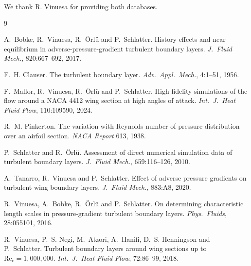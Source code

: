 \documentclass[11pt,a4paper]{article}
\begin{document}
We thank R. Vinuesa for providing both databases.

\begin{thebibliography}{9}
\small

A.~Bobke, R.~Vinuesa, R.~Örlü and P.~Schlatter.
History effects and near equilibrium in adverse-pressure-gradient turbulent
boundary layers.
\emph{J.\ Fluid Mech.}, 820:667--692, 2017.

F.~H. Clauser.
The turbulent boundary layer.
\emph{Adv.\ Appl.\ Mech.}, 4:1--51, 1956.

F.~Mallor, R.~Vinuesa, R.~Örlü and P.~Schlatter.
High-fidelity simulations of the flow around a NACA 4412 wing section at high
angles of attack.
\emph{Int.\ J.\ Heat Fluid Flow}, 110:109590, 2024.

R.~M. Pinkerton.
The variation with Reynolds number of pressure distribution over an airfoil
section.
\emph{NACA Report} 613, 1938.

P.~Schlatter and R.~Örlü.
Assessment of direct numerical simulation data of turbulent boundary layers.
\emph{J.\ Fluid Mech.}, 659:116--126, 2010.

A.~Tanarro, R.~Vinuesa and P.~Schlatter.
Effect of adverse pressure gradients on turbulent wing boundary layers.
\emph{J.\ Fluid Mech.}, 883:A8, 2020.

R.~Vinuesa, A.~Bobke, R.~Örlü and P.~Schlatter.
On determining characteristic length scales in pressure-gradient turbulent
boundary layers.
\emph{Phys.\ Fluids}, 28:055101, 2016.

R.~Vinuesa, P.~S. Negi, M.~Atzori, A.~Hanifi, D.~S. Henningson and
P.~Schlatter.
Turbulent boundary layers around wing sections up to
$\mathrm{Re}_c = 1{,}000{,}000$.
\emph{Int.\ J.\ Heat Fluid Flow}, 72:86--99, 2018.

\end{thebibliography}
\end{document}

